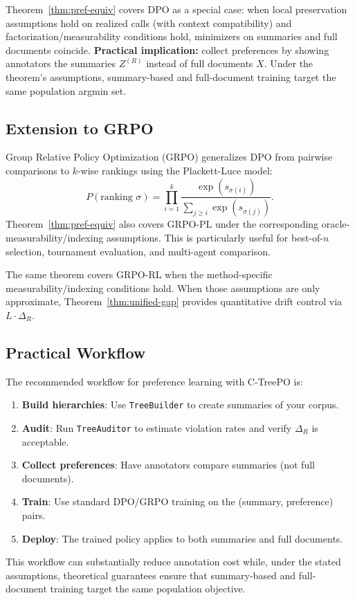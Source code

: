 Theorem~\ref{thm:pref-equiv} covers DPO as a special case: when local preservation assumptions hold on realized calls (with context compatibility) and factorization/measurability conditions hold, minimizers on summaries and full documents coincide. \textbf{Practical implication:} collect preferences by showing annotators the summaries $Z^{(R)}$ instead of full documents $X$. Under the theorem's assumptions, summary-based and full-document training target the same population argmin set.

\subsection{Extension to GRPO}

Group Relative Policy Optimization (GRPO) generalizes DPO from pairwise comparisons to $k$-wise rankings using the Plackett-Luce model:
\[
P(\text{ranking } \sigma) = \prod_{i=1}^k \frac{\exp(s_{\sigma(i)})}{\sum_{j \ge i} \exp(s_{\sigma(j)})}.
\]
Theorem~\ref{thm:pref-equiv} also covers GRPO-PL under the corresponding oracle-measurability/indexing assumptions. This is particularly useful for best-of-$n$ selection, tournament evaluation, and multi-agent comparison.

The same theorem covers GRPO-RL when the method-specific measurability/indexing conditions hold. When those assumptions are only approximate, Theorem~\ref{thm:unified-gap} provides quantitative drift control via $L\cdot\Delta_R$.

\subsection{Practical Workflow}

The recommended workflow for preference learning with C-TreePO is:
\begin{enumerate}[nosep]
    \item \textbf{Build hierarchies}: Use \texttt{TreeBuilder} to create summaries of your corpus.
    \item \textbf{Audit}: Run \texttt{TreeAuditor} to estimate violation rates and verify $\Delta_R$ is acceptable.
    \item \textbf{Collect preferences}: Have annotators compare summaries (not full documents).
    \item \textbf{Train}: Use standard DPO/GRPO training on the (summary, preference) pairs.
    \item \textbf{Deploy}: The trained policy applies to both summaries and full documents.
\end{enumerate}
This workflow can substantially reduce annotation cost while, under the stated assumptions, theoretical guarantees ensure that summary-based and full-document training target the same population objective.

